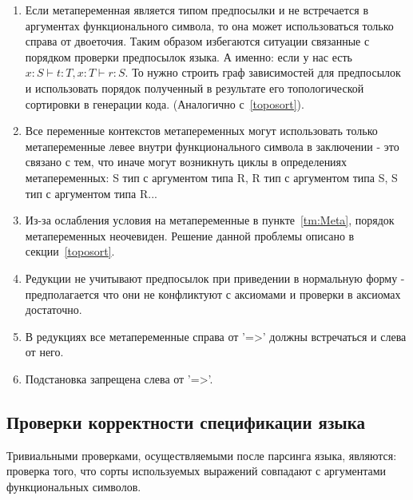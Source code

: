 \begin{enumerate}
\item Если метапеременная является типом предпосылки и не встречается в аргументах функционального символа, то она может использоваться только справа от двоеточия. Таким образом избегаются ситуации связанные с порядком проверки предпосылок языка. А именно: если у нас есть $x : S \vdash t : T, x:T \vdash r : S$. То нужно строить граф зависимостей для предпосылок и использовать порядок полученный в результате его топологической сортировки в генерации кода. (Аналогично с~\ref{toposort}).

\item Все переменные контекстов метапеременных могут использовать только метапеременные левее внутри функционального символа в заключении - это связано с тем, что иначе могут возникнуть циклы в определениях метапеременных: S тип с аргументом типа R, R тип с аргументом типа S, S тип с аргументом типа R...

\item Из-за ослабления условия на метапеременные в пункте~\ref{tm:Meta}, порядок метапеременных неочевиден. Решение данной проблемы описано в секции~\ref{toposort}.

\item Редукции не учитывают предпосылок при приведении в нормальную форму - предполагается что они не конфликтуют с аксиомами и проверки в аксиомах достаточно.

\item В редукциях все метапеременные справа от '=>' должны встречаться и слева от него.

\item Подстановка запрещена слева от '=>'.



\end{enumerate}

\subsection{Проверки корректности спецификации языка}

Тривиальными проверками, осуществляемыми после парсинга языка, являются: проверка того, что сорты используемых выражений совпадают с аргументами функциональных символов. 
